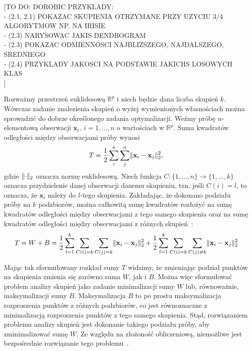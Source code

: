 \documentclass{praca1}
\DeclarePairedDelimiter{\norm}{\lVert}{\rVert}
\begin{document}
[TO DO: DOROBIC PRZYKLADY:\\
- (2.1, 2.1) POKAZAC SKUPIENIA OTRZYMANE PRZY UZYCIU 3/4 ALGORYTMOW NP. NA IRISIE\\
- (2.3) NARYSOWAC JAKIS DENDROGRAM\\
- (2.3) POKAZAC ODMIENNOSCI NAJBLIZSZEGO, NAJDALSZEGO, SREDNIEGO\\
- (2.4) PRZYKLADY JAKOSCI NA PODSTAWIE JAKICHS LOSOWYCH KLAS\\]

Rozważmy przestrzeń euklidesową $\mathbb{R}^p$ i niech będzie dana liczba skupień $k$. Wówczas zadanie znalezienia skupień o wyżej wymienionych własnościach można sprowadzić do dobrze określonego zadania optymalizacji. Weźmy próbę $n$-elementową obserwacji $\mathbf{x}_i,\ i = 1,\ldots,n$ o wartościach w $\mathbb{R}^p$. %
Suma kwadratów odległości między obserwacjami próby wynosi~\cite{Koronacki2005:statystyczne}
\begin{equation}
T = \frac{1}{2}\sum\limits_{i}^{n}\sum\limits_{j}^{n} \norm{\mathbf{x}_i - \mathbf{x}_j}_2^2,
\end{equation}
gdzie $\norm{\cdot}_2$ oznacza normę euklidesową. Niech funkcja $C:\{1,\ldots,n\} \rightarrow \{1,\ldots, k\}$ oznacza przydzielenie danej obserwacji danemu skupieniu, tzn. jeśli $C(i) = l$, to oznacza, że $\mathbf{x}_i$ należy do $l$-tego skupienia. Zakładając, że dokonano podziału próby na $k$ podzbiorów, można całkowitą sumę kwadratów rozłożyć na sumę kwadratów odległości między obserwacjami z tego samego skupienia oraz na sumę kwadratów odległości między obserwacjami z różnych skupień~\cite{Koronacki2005:statystyczne}:
\begin{equation}
T = W + B = \frac{1}{2}\sum\limits_{l=1}^{k}\sum\limits_{C(i) = k}\sum\limits_{C(j) = k} \norm{\mathbf{x}_i - \mathbf{x}_j}_2^2 + \frac{1}{2}\sum\limits_{l=1}^{k}\sum\limits_{C(i) = k}\sum\limits_{C(j) \neq k} \norm{\mathbf{x}_i - \mathbf{x}_j}_2^2 
\end{equation}

Mając tak sformułowany rozkład sumy $T$ widzimy, że zmieniając podział punktów na skupienia zmienia się zarówno suma $W$, jak i $B$. Można więc sformułować problem analizy skupień jako zadanie minimalizacji sumy $W$ lub, równoważnie, maksymalizacji sumy $B$. Maksymalizacja $B$ to po prostu maksymalizacja rozproszenia punktów z różnych podzbiorów, co jest równoznaczne z minimalizacją rozproszenia punktów z tego samego skupienia. Stąd, rozwiązaniem problemu analizy skupień jest dokonanie takiego podziału próby, aby zminimalizować sumę $W$. Ze względu na złożoność obliczeniową, niemożliwe jest bezpośrednie rozwiązanie tego problemu~\cite{Koronacki2005:statystyczne}.
\end{document}
